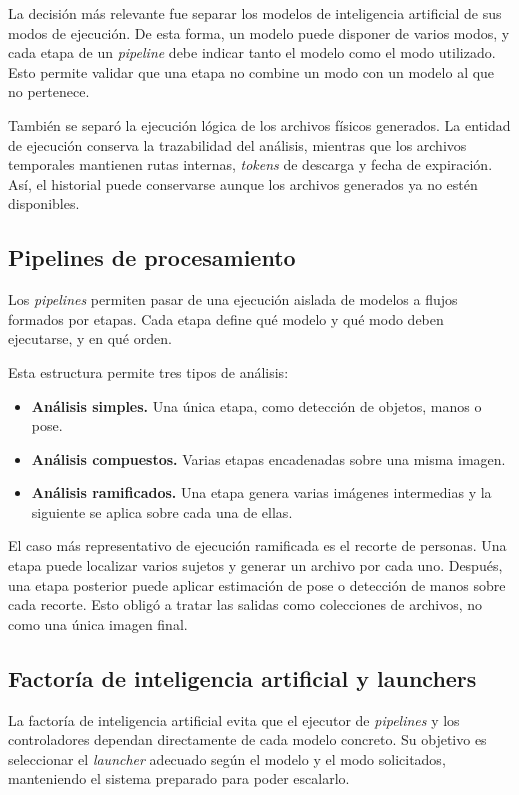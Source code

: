 La decisión más relevante fue separar los modelos de inteligencia artificial de sus modos de ejecución. De esta forma, un modelo puede disponer de varios modos, y cada etapa de un \textit{pipeline} debe indicar tanto el modelo como el modo utilizado. Esto permite validar que una etapa no combine un modo con un modelo al que no pertenece.

También se separó la ejecución lógica de los archivos físicos generados. La entidad de ejecución conserva la trazabilidad del análisis, mientras que los archivos temporales mantienen rutas internas, \textit{tokens} de descarga y fecha de expiración. Así, el historial puede conservarse aunque los archivos generados ya no estén disponibles.

\subsection{Pipelines de procesamiento}

Los \textit{pipelines} permiten pasar de una ejecución aislada de modelos a flujos formados por etapas. Cada etapa define qué modelo y qué modo deben ejecutarse, y en qué orden.

Esta estructura permite tres tipos de análisis:

\begin{itemize}
	\item \textbf{Análisis simples.} Una única etapa, como detección de objetos, manos o pose.
	\item \textbf{Análisis compuestos.} Varias etapas encadenadas sobre una misma imagen.
	\item \textbf{Análisis ramificados.} Una etapa genera varias imágenes intermedias y la siguiente se aplica sobre cada una de ellas.
\end{itemize}

El caso más representativo de ejecución ramificada es el recorte de personas. Una etapa puede localizar varios sujetos y generar un archivo por cada uno. Después, una etapa posterior puede aplicar estimación de pose o detección de manos sobre cada recorte. Esto obligó a tratar las salidas como colecciones de archivos, no como una única imagen final.

\subsection{Factoría de inteligencia artificial y launchers}

La factoría de inteligencia artificial evita que el ejecutor de \textit{pipelines} y los controladores dependan directamente de cada modelo concreto. Su objetivo es seleccionar el \textit{launcher} adecuado según el modelo y el modo solicitados, manteniendo el sistema preparado para poder escalarlo.

